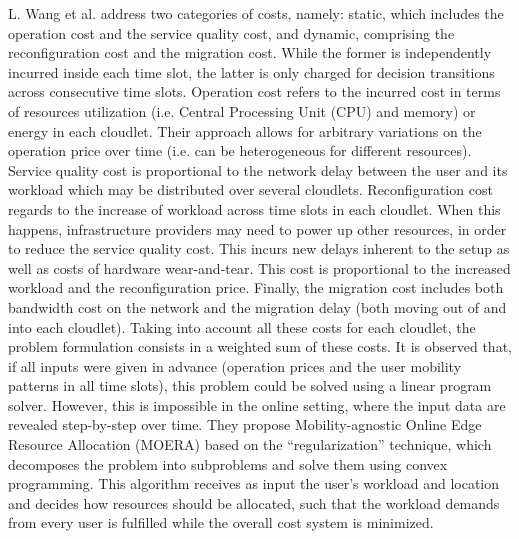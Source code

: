 \noindent\tab L. Wang \cite{wang2018moera} et al. address two categories of costs, namely: static, which includes the operation cost and the service quality cost, and dynamic, comprising the reconfiguration cost and the migration cost. While the former is independently incurred inside each time slot, the latter is only charged for decision transitions across consecutive time slots. Operation cost refers to the incurred cost in terms of resources utilization (i.e. Central Processing Unit (CPU) and memory) or energy in each cloudlet. Their approach allows for arbitrary variations on the operation price over time (i.e. can be heterogeneous for different resources). Service quality cost is proportional to the network delay between the user and its workload which may be distributed over several cloudlets. Reconfiguration cost regards to the increase of workload across time slots in each cloudlet. When this happens, infrastructure providers may need to power up other resources, in order to reduce the service quality cost. This incurs new delays inherent to the setup as well as costs of hardware wear-and-tear. This cost is proportional to the increased workload and the reconfiguration price. Finally, the migration cost includes both bandwidth cost on the network and the migration delay (both moving out of and into each cloudlet). Taking into account all these costs for each cloudlet, the problem formulation consists in a weighted sum of these costs. It is observed that, if all inputs were given in advance (operation prices and the user mobility patterns in all time slots), this problem could be solved using a linear program solver. However, this is impossible in the online setting, where the input data are revealed step-by-step over time. They propose Mobility-agnostic Online Edge Resource Allocation (MOERA) based on the ``regularization'' technique, which decomposes the problem into subproblems and solve them using convex programming. This algorithm receives as input the user’s workload and location and decides how resources should be allocated, such that the workload demands from every user is fulfilled while the overall cost system is minimized. %

